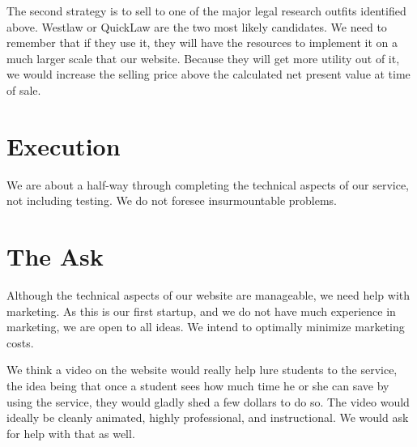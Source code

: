 \documentclass[11pt]{article}
\begin{document}
The second strategy is to sell to one of the major legal research outfits identified above. Westlaw or QuickLaw are the two most likely candidates. We need to remember that if they use it, they will have the resources to implement it on a much larger scale that our website. Because they will get more utility out of it, we would increase the selling price above the calculated net present value at time of sale.

\section*{Execution}

We are about a half-way through completing the technical aspects of our service, not including testing. We do not foresee insurmountable problems.


\section*{The Ask}

Although the technical aspects of our website are manageable, we need help with marketing. As this is our first startup, and we do not have much experience in marketing, we are open to all ideas. We intend to optimally minimize marketing costs.

We think a video on the website would really help lure students to the service, the idea being that once a student sees how much time he or she can save by using the service, they would gladly shed a few dollars to do so. The video would ideally be cleanly animated, highly professional, and instructional. We would ask for help with that as well.
\end{document}
